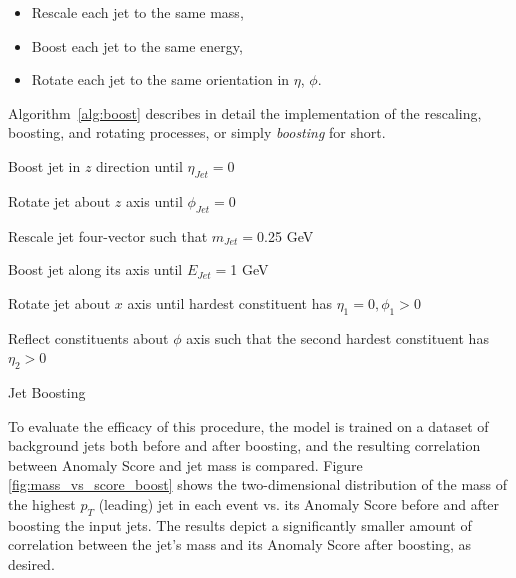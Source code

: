 \documentclass[11pt, a4paper]{article}
\begin{document}
\begin{itemize}
	\item{Rescale each jet to the same mass,}
	\item{Boost each jet to the same energy,}
	\item{Rotate each jet to the same orientation in $\eta$, $\phi$.}
\end{itemize}

Algorithm~\ref{alg:boost} describes in detail the implementation of the rescaling, boosting, and rotating processes, or simply \textit{boosting} for short. 

\begin{algorithm}[H]
\SetAlgoLined
{}
  \Beginning{}

  Boost jet in $z$ direction until $\eta_{Jet} = 0$
 
  Rotate jet about $z$ axis until $\phi_{Jet} = 0$
 
  Rescale jet four-vector such that $m_{Jet} = $0.25 GeV
 
  Boost jet along its axis until $E_{Jet} = $1 GeV
 
  Rotate jet about $x$ axis until hardest constituent has $\eta_{1} = 0, \phi_{1} > 0$
 
 
 

 
Reflect constituents about $\phi$ axis such that the second hardest constituent has $\eta_{2} > 0$
 
\caption{Jet Boosting}
\label{alg:boost}
\end{algorithm}





To evaluate the efficacy of this procedure, the model is trained on a dataset of background jets both before and after boosting, and the resulting correlation between Anomaly Score and jet mass is compared. Figure \ref{fig:mass_vs_score_boost} shows the two-dimensional distribution of the mass of the highest $p_T$ (leading) jet in each event vs. its Anomaly Score before and after boosting the input jets. The results depict a significantly smaller amount of correlation between the jet's mass and its Anomaly Score after boosting, as desired.
\end{document}
